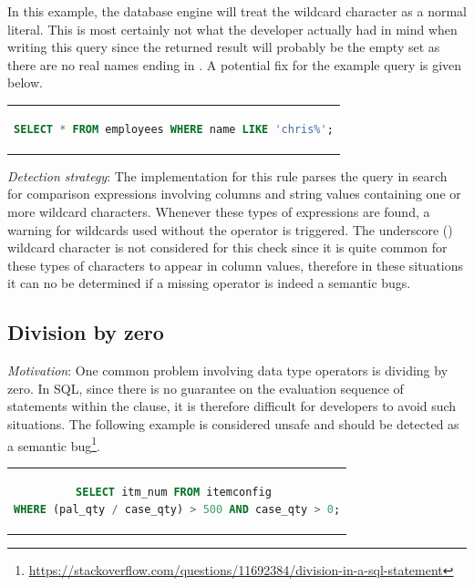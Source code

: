In this example, the database engine will treat the wildcard character \sql{\%} as a normal literal. This is most certainly not what the developer actually had in mind when writing this query since the returned result will probably be the empty set as there are no real names ending in \sql{\%}. A potential fix for the example query is given below.

\begin{center}
\begin{tabular}{c}
\begin{lstlisting}[language=SQL]
SELECT * FROM employees WHERE name LIKE 'chris%';
\end{lstlisting}
\end{tabular}
\end{center}

\noindent \emph{Detection strategy}: The implementation for this rule parses the query in search for comparison expressions involving columns and string values containing one or more wildcard characters. Whenever these types of expressions are found, a warning for wildcards used without the  operator is triggered. The underscore (\sql{_}) wildcard character is not considered for this check since it is quite common for these types of characters to appear in column values, therefore in these situations it can no be determined if a missing  operator is indeed a semantic bugs. 

\subsection{Division by zero}
\emph{Motivation}: One common problem involving data type operators is dividing by zero. In SQL, since there is no guarantee on the evaluation sequence of statements within the  clause, it is therefore difficult for developers to avoid such situations. The following example is considered unsafe and should be detected as a semantic bug\footnote{\url{https://stackoverflow.com/questions/11692384/division-in-a-sql-statement}}.

\begin{center}
\begin{tabular}{c}
\begin{lstlisting}[language=SQL]
SELECT itm_num FROM itemconfig 
WHERE (pal_qty / case_qty) > 500 AND case_qty > 0;
\end{lstlisting}
\end{tabular}
\end{center}

